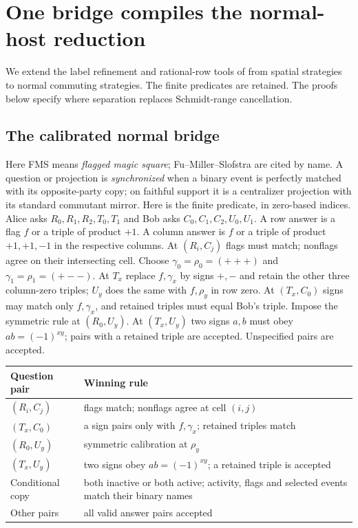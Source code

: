 
\section{One bridge compiles the normal-host reduction}\label{sec:compiler}
We extend the label refinement and rational-row tools of
\cite[Lemma 4.2 and Theorem B]{Entropy} from spatial strategies to normal
commuting strategies. The finite predicates are retained. The proofs
below specify where separation replaces Schmidt-range cancellation.

\subsection{The calibrated normal bridge}
Here FMS means \emph{flagged magic square}; Fu--Miller--Slofstra
are cited by name. A question or projection is \emph{synchronized}
when a binary event is perfectly matched with its opposite-party
copy; on faithful support it is a centralizer projection with its
standard commutant mirror. Here is the finite predicate, in zero-based indices.
Alice asks $R_0,R_1,R_2,T_0,T_1$ and Bob asks $C_0,C_1,C_2,U_0,U_1$.
A row answer is a flag $f$ or a triple of product $+1$.
A column answer is $f$ or a triple of product $+1,+1,-1$ in the
respective columns. At $(R_i,C_j)$ flags must match; nonflags agree
on their intersecting cell. Choose $\gamma_0=\rho_0=(+++)$ and
$\gamma_1=\rho_1=(+--)$. At $T_x$ replace $f,\gamma_x$ by signs $+,-$ and retain
the other three column-zero triples; $U_y$ does the same with
$f,\rho_y$ in row zero. At $(T_x,C_0)$ signs may match only $f,\gamma_x$,
and retained triples must equal Bob's triple. Impose the symmetric
rule at $(R_0,U_y)$. At $(T_x,U_y)$ two signs $a,b$ must obey
$ab=(-1)^{xy}$; pairs with a retained triple are accepted.
Unspecified pairs are accepted.

\begin{center}\small
\begin{tabular}{@{}p{.24\linewidth}p{.66\linewidth}@{}}
\toprule Question pair & Winning rule\\\midrule
$(R_i,C_j)$ & flags match; nonflags agree at cell $(i,j)$\\
$(T_x,C_0)$ & a sign pairs only with $f,\gamma_x$; retained triples match\\
$(R_0,U_y)$ & symmetric calibration at $\rho_y$\\
$(T_x,U_y)$ & two signs obey $ab=(-1)^{xy}$; a retained triple is accepted\\
Conditional copy & both inactive or both active; activity, flags and selected events match their binary names\\
Other pairs & all valid answer pairs accepted\\\bottomrule
\end{tabular}
\end{center}


